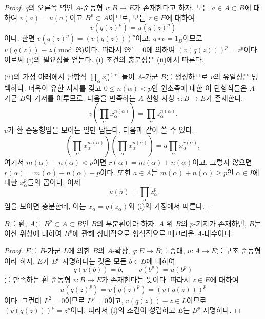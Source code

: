 \begin{proof}
$q$의 오른쪽 역인 $A$-준동형 $v:B\to E$가 존재한다고 하자. 모든
$a\in A\subset B$에 대하여 $v(a)=u(a)$이고 $B^p\subset A$이므로,
모든 $z\in E$에 대하여
\[
  v(q(z)^p)=u(q(z)^p)
\]
이다. 한편 $v(q(z)^p)=(v(q(z)))^p$이고, $q\circ v=1_B$이므로
$v(q(z))\equiv z\pmod{\mathfrak R}$이다. 따라서
$\mathfrak R^p=0$에 의하여 $(v(q(z)))^p=z^p$이다. 이로써 (i)의
필요성을 얻는다. (i) 조건의 충분성은 (ii)에서 따른다.

(ii)의 가정 아래에서 단항식 $\prod_\alpha x_\alpha^{n(\alpha)}$들이
$A$-가군 $B$를 생성하므로 $v$의 유일성은 명백하다. 더욱이 유한
지지를 갖고 $0\leq n(\alpha)<p$인 원소족에 대한 이 단항식들은
$A$-가군 $B$의 기저를 이루므로, 다음을 만족하는 $A$-선형 사상
$v:B\to E$가 존재한다.
\[
  v\left(\prod_\alpha x_\alpha^{n(\alpha)}\right)
  =\prod_\alpha z_\alpha^{n(\alpha)}.
\]
$v$가 환 준동형임을 보이는 일만 남는다. 다음과 같이 쓸 수 있다.
\[
  \left(\prod_\alpha x_\alpha^{m(\alpha)}\right)
  \left(\prod_\alpha x_\alpha^{n(\alpha)}\right)
  =a\prod_\alpha x_\alpha^{r(\alpha)},
\]
여기서 $m(\alpha)+n(\alpha)<p$이면
$r(\alpha)=m(\alpha)+n(\alpha)$이고, 그렇지 않으면
$r(\alpha)=m(\alpha)+n(\alpha)-p$이다. 또한 $a\in A$는
$m(\alpha)+n(\alpha)\geq p$인 $\alpha\in I$에 대한
$x_\alpha^p$들의 곱이다. 이제
\[
  u(a)=\prod_\alpha z_\alpha^p
\]
임을 보이면 충분한데, 이는 $x_\alpha=q(z_\alpha)$와 (i)의 가정에서
따른다.
\end{proof}

\begin{corollary}[21.2.2]
\label{0.21.2.2-ko}
$B$를 환, $A$를 $B^p\subset A\subset B$인 $B$의 부분환이라 하자.
$A$ 위 $B$의 $p$-기저가 존재하면, $B$는 이산 위상에 대하여
$B^p$에 관해 상대적으로 형식적으로 매끄러운 $A$-대수이다.
\end{corollary}

\begin{proof}
$E$를 $B$-가군 $L$에 의한 $B$의 $A$-확장, $q:E\to B$를 증대,
$u:A\to E$를 구조 준동형이라 하자. $E$가 $B^p$-자명하다는 것은
모든 $b\in B$에 대하여
\[
  q(v(b))=b,\qquad v(b^p)=u(b^p)
\]
를 만족하는 환 준동형 $v:B\to E$가 존재한다는 뜻이다. 따라서
$z\in E$에 대하여
\[
  u(q(z)^p)=v(q(z)^p)=(v(q(z)))^p
\]
이다. 그런데 $L^2=0$이므로 $L^p=0$이고,
$v(q(z))-z\in L$이므로 $(v(q(z)))^p=z^p$이다. 따라서
(i)의 조건이 성립하고 $E$는 $B^p$-자명하다.
\end{proof}

